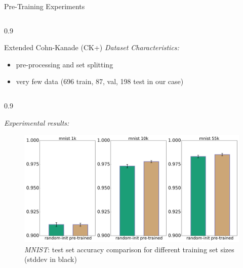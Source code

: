 \documentclass[final]{beamer}
\newlength{\onecolwid}
\newlength{\threecolwid}
\begin{document}
\begin{frame}[t]
\begin{columns}[t]
\begin{column}{\threecolwid}
\begin{alertblock}{Pre-Training Experiments}
\begin{columns}[t, totalwidth=0.9\threecolwid]
\begin{column}{0.9\onecolwid}
\begin{block}{Extended Cohn-Kanade (CK+)}
	\emph{Dataset Characteristics:}\\
	\begin{itemize} 
		\item pre-processing and set splitting %
		\item very few data (696 train, 87, val, 198 test in our case)
	\end{itemize}

	\end{block}

	\end{column}

\end{columns}


\begin{columns}[t, totalwidth=0.9\threecolwid] %


	\begin{column}{0.9\onecolwid} %
	\begin{block}{}
	\emph{Experimental results:}

	\begin{figure}
	\includegraphics[width=\linewidth]{box_plots/boxplots_mnist.png}
	\caption{\emph{MNIST}: test set accuracy comparison for different training set sizes (stddev in black)}
	\end{figure}


\end{block}
\end{column}
\end{columns}
\end{alertblock}
\end{column}
\end{columns}
\end{frame}
\end{document}
